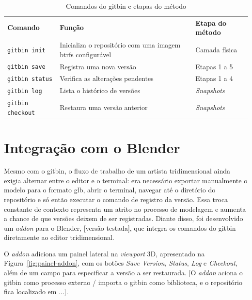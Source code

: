 \begin{table}[htb]
  \centering
  \caption{\label{tab:comandos-gitbin}Comandos do gitbin e etapas do método}
  \begin{tabular}{p{2.8cm}p{6.5cm}p{4.2cm}}
    \toprule
    \textbf{Comando} & \textbf{Função} & \textbf{Etapa do método} \\
    \midrule
    \texttt{gitbin init}     & Inicializa o repositório com uma imagem \gls{btrfs} configurável & Camada física \\
    \texttt{gitbin save}     & Registra uma nova versão & Etapas 1 a 5 \\
    \texttt{gitbin status}   & Verifica as alterações pendentes & Etapas 1 a 4 \\
    \texttt{gitbin log}      & Lista o histórico de versões & \textit{Snapshots} \\
    \texttt{gitbin checkout} & Restaura uma versão anterior & \textit{Snapshots} \\
    \bottomrule
  \end{tabular}
\end{table}

\section{Integração com o Blender}\label{sec:addon}

Mesmo com o gitbin, o fluxo de trabalho de um artista tridimensional ainda exigia alternar entre o editor e o terminal: era necessário exportar manualmente o modelo para o formato \gls{glb}, abrir o terminal, navegar até o diretório do repositório e só então executar o comando de registro da versão. Essa troca constante de contexto representa um atrito no processo de modelagem e aumenta a chance de que versões deixem de ser registradas. Diante disso, foi desenvolvido um \textit{addon} para o Blender, [versão testada], que integra os comandos do gitbin diretamente ao editor tridimensional.

O \textit{addon} adiciona um painel lateral na \textit{viewport} 3D, apresentado na Figura~\ref{fig:painel-addon}, com os botões \textit{Save Version}, \textit{Status}, \textit{Log} e \textit{Checkout}, além de um campo para especificar a versão a ser restaurada. [O \textit{addon} aciona o gitbin como processo externo / importa o gitbin como biblioteca, e o repositório fica localizado em ...].


